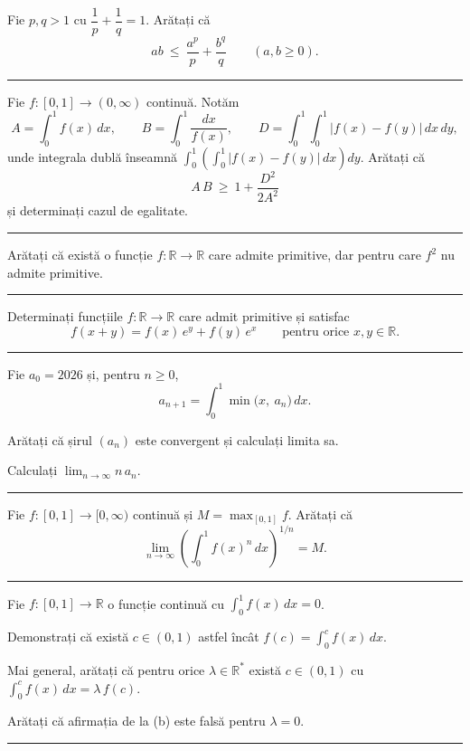 Fie $p,q>1$ cu $\dfrac1p+\dfrac1q=1$. Arătați că
\[ ab\ \le\ \frac{a^p}{p}+\frac{b^q}{q}\qquad(a,b\ge0). \]
\vspace{1mm}\hrule

Fie $f:[0,1]\to(0,\infty)$ continuă. Notăm
\[ A=\int_{0}^{1}f(x)\,dx,\qquad B=\int_{0}^{1}\frac{dx}{f(x)},\qquad D=\int_{0}^{1}\!\!\int_{0}^{1}\bigl|f(x)-f(y)\bigr|\,dx\,dy , \]
unde integrala dublă înseamnă $\displaystyle\int_{0}^{1}\left(\int_{0}^{1}\bigl|f(x)-f(y)\bigr|\,dx\right)dy$. Arătați că
\[ A\,B\ \ge\ 1+\frac{D^{2}}{2A^{2}} \]
și determinați cazul de egalitate.
\vspace{1mm}\hrule

Arătați că există o funcție $f:\mathbb{R}\to\mathbb{R}$ care admite primitive, dar pentru care $f^2$ nu admite primitive.
\vspace{1mm}\hrule

Determinați funcțiile $f:\mathbb{R}\to\mathbb{R}$ care admit primitive și satisfac
\[ f(x+y)=f(x)\,e^y+f(y)\,e^x\qquad\text{pentru orice }x,y\in\mathbb{R}. \]
\vspace{1mm}\hrule

Fie $a_{0}=2026$ și, pentru $n\ge0$,
\[ a_{n+1}=\int_{0}^{1}\min\bigl(x,\ a_{n}\bigr)\,dx . \]
\begin{parti}
  \item Arătați că șirul $(a_{n})$ este convergent și calculați limita sa.
  \item Calculați $\displaystyle\lim_{n\to\infty}n\,a_{n}$.
\end{parti}
\vspace{1mm}\hrule

Fie $f : [0,1] \to [0,\infty)$ continuă și $M = \max_{[0,1]} f$. Arătați că
\[
\lim_{n\to\infty} \left( \int_0^1 f(x)^n \, dx \right)^{1/n} = M.
\]
\vspace{1mm}\hrule

Fie $f:[0,1]\to\mathbb{R}$ o funcție continuă cu $\displaystyle\int_0^1 f(x)\,dx=0$.
\begin{parti}
  \item Demonstrați că există $c\in(0,1)$ astfel încât
        $\displaystyle f(c)=\int_0^c f(x)\,dx$.
  \item Mai general, arătați că pentru orice $\lambda\in\mathbb{R}^{*}$ există
        $c\in(0,1)$ cu $\displaystyle\int_0^c f(x)\,dx=\lambda\,f(c)$.
  \item Arătați că afirmația de la (b) este falsă pentru $\lambda=0$.
\end{parti}
\vspace{1mm}\hrule

